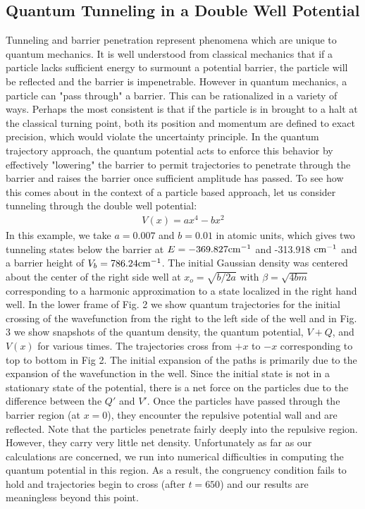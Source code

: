 \subsection{Quantum Tunneling in a Double Well Potential}
Tunneling and barrier penetration represent phenomena which are unique 
to quantum mechanics.  It is well understood from classical mechanics 
that if a particle lacks sufficient energy to surmount a potential 
barrier, the particle will be reflected and the barrier is 
impenetrable.  However in quantum mechanics, a particle can "pass 
through" a barrier.  This can be rationalized in a variety of ways.  
Perhaps the most consistent is that if the particle is in brought to a 
halt at the classical turning point, both its position and momentum 
are defined to exact precision, which would violate the uncertainty 
principle.  In the quantum trajectory approach, the quantum potential acts 
to enforce this behavior by effectively "lowering" the barrier to 
permit trajectories to penetrate through the barrier and raises the 
barrier once sufficient amplitude has passed.  To see how this comes 
about in the context of a particle based approach, let us consider 
tunneling through the double well potential:
\begin{eqnarray}
V(x)   =   a   {x^4}-   b {x^2} \label{eq:31}
\end{eqnarray}
In this example, we take $ a =0.007$ and $b= 0.01$ in atomic units, 
which gives two tunneling states below the barrier at $E= 
-369.827{\rm cm}^{-1}$ and -313.918 ${\rm cm}^{-1}$ and a barrier height of 
$V_b=786.24{\rm cm}^{-1}$.  The initial Gaussian density was centered about the 
center of the right side well at $x_o=\sqrt{b/2a}$ with $\beta=\sqrt{4 
b m}$ corresponding to a harmonic approximation to a state localized 
in the right hand well.  In the lower frame of Fig.  2 we show quantum 
trajectories for the initial crossing of the wavefunction from the 
right to the left side of the well and in Fig.  3 we show snapshots of 
the quantum density, the quantum potential, $V+Q$, and $V(x)$ for 
various times.  The trajectories cross from $+x$ to $-x$ corresponding 
to top to bottom in Fig 2.  The initial expansion of the paths is 
primarily due to the expansion of the wavefunction in the well.  Since 
the initial state is not in a stationary state of the potential, there 
is a net force on the particles due to the difference between the $Q'$ 
and $V'$.  Once the particles have passed through the barrier region 
(at $x=0$), they encounter the repulsive potential wall and are 
reflected.  Note that the particles penetrate fairly deeply into the 
repulsive region.  However, they carry very little net density.  
Unfortunately as far as our calculations are concerned, we run into 
numerical difficulties in computing the quantum potential in this region.  
As a result, the congruency condition fails to hold and trajectories 
begin to cross (after $t = 650$) and our results are meaningless 
beyond this point.



